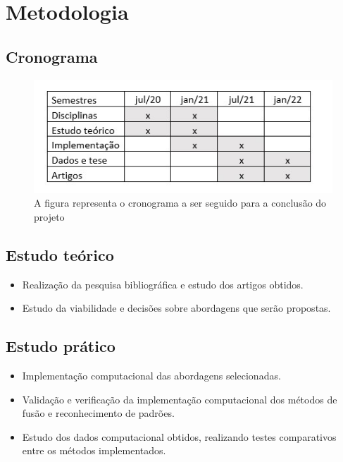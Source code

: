 \documentclass[runningheads]{llncs}
\begin{document}
\section{Metodologia}

\subsection{Cronograma}
\begin{figure}
\begin{center}
\includegraphics[scale=0.8]{cronograma.jpg}
\end{center}
\caption{A figura representa o cronograma a ser seguido para a conclusão do projeto} \label{fig1}
\end{figure}


\subsection{Estudo teórico}
\begin{itemize}
  \item Realização da pesquisa bibliográfica e estudo dos artigos obtidos.
  \item Estudo da viabilidade e decisões sobre abordagens que serão propostas.
\end{itemize}

\subsection{Estudo prático}

\begin{itemize}
  \item Implementação computacional das abordagens selecionadas.
  \item Validação e verificação da implementação computacional dos métodos de fusão e reconhecimento de padrões.
  \item Estudo dos dados computacional obtidos, realizando testes comparativos entre os métodos implementados.
\end{itemize}
\end{document}
